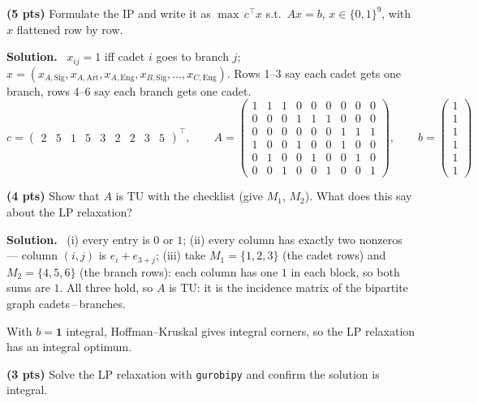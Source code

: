 \documentclass[10pt]{article}
\newenvironment{solution}
  {\par\smallskip\begingroup\color{solink}\textbf{Solution.}\ }
  {\endgroup\par}
\begin{document}
\begin{parts}
\item \textbf{(5 pts)} Formulate the IP and write it as $\max\, c^{\top}x$ s.t.\
  $Ax = b$, $x \in \{0,1\}^9$, with $x$ flattened row by row.

\begin{solution}
$x_{ij} = 1$ iff cadet $i$ goes to branch $j$;
$x = (x_{A,\mathrm{Sig}}, x_{A,\mathrm{Art}}, x_{A,\mathrm{Eng}}, x_{B,\mathrm{Sig}}, \dots, x_{C,\mathrm{Eng}})$.
Rows 1--3 say each cadet gets one branch, rows 4--6 say each branch gets one cadet.
\[
c = \begin{pmatrix} 2 & 5 & 1 & 5 & 3 & 2 & 2 & 3 & 5 \end{pmatrix}^{\top}, \qquad
A = \begin{pmatrix}
 1&1&1&0&0&0&0&0&0\\
 0&0&0&1&1&1&0&0&0\\
 0&0&0&0&0&0&1&1&1\\
 1&0&0&1&0&0&1&0&0\\
 0&1&0&0&1&0&0&1&0\\
 0&0&1&0&0&1&0&0&1
\end{pmatrix}, \qquad
b = \begin{pmatrix} 1 \\ 1 \\ 1 \\ 1 \\ 1 \\ 1 \end{pmatrix}
\]
\end{solution}

\item \textbf{(4 pts)} Show that $A$ is TU with the checklist (give $M_1$, $M_2$). What
  does this say about the LP relaxation?

\begin{solution}
(i) every entry is $0$ or $1$; (ii) every column has exactly two nonzeros --- column $(i,j)$
is $e_i + e_{3+j}$; (iii) take $M_1 = \{1,2,3\}$ (the cadet rows) and $M_2 = \{4,5,6\}$ (the
branch rows): each column has one $1$ in each block, so both sums are $1$. All three hold,
so $A$ is TU: it is the incidence matrix of the bipartite graph cadets\,--\,branches.

With $b = \mathbf{1}$ integral, Hoffman--Kruskal gives integral corners, so the LP
relaxation has an integral optimum.
\end{solution}

\item \textbf{(3 pts)} Solve the LP relaxation with \texttt{gurobipy} and confirm the
  solution is integral.


\end{parts}
\end{document}
